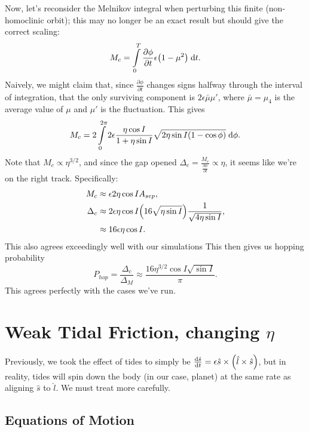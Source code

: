 \documentclass[11pt,
        usenames, %
        dvipsnames %
    ]{article}
\newcommand*{\rd}[2]{\frac{\mathrm{d}#1}{\mathrm{d}#2}}
\newcommand*{\pd}[2]{\frac{\partial#1}{\partial#2}}
\DeclarePairedDelimiter\p{\lparen}{\rparen}
\begin{document}
Now, let's reconsider the Melnikov integral when perturbing this finite
(non-homoclinic orbit); this may no longer be an exact result but should give
the correct scaling:
\begin{equation}
    M_c = \int\limits_0^T \pd{\phi}{t}\epsilon \p*{1 - \mu^2}\;\mathrm{d}t.
\end{equation}
Naively, we might claim that, since $\pd{\phi}{t}$ changes signs halfway through
the interval of integration, that the only surviving component is $2\epsilon
\bar{\mu}\mu'$, where $\bar{\mu} = \mu_4$ is the average value of $\mu$ and
$\mu'$ is the fluctuation. This gives
\begin{equation}
    M_c = 2\int\limits_0^{2\pi}2\epsilon \frac{\eta \cos I}{1 + \eta \sin I}
        \sqrt{2\eta \sin I \p*{1 - \cos \phi}}\;\mathrm{d}\phi.
\end{equation}
Note that $M_c \propto \eta^{3/2}$, and since the gap opened $\Delta_c =
\frac{M_c}{\pd{\phi}{t}} \propto \eta$, it seems like we're on the right track.
Specifically:
\begin{align}
    M_c &\approx \epsilon 2\eta \cos I A_{sep},\\
    \Delta_c &\approx 2\epsilon \eta \cos I \p*{16 \sqrt{\eta \sin I}}
        \frac{1}{\sqrt{4\eta \sin I}},\\
        &\approx 16\epsilon \eta \cos I.
\end{align}
This also agrees exceedingly well with our simulations This then gives us
hopping probability
\begin{equation}
    P_{hop} = \frac{\Delta_c}{\Delta_M} \approx
        \frac{16\eta^{3/2}\cos I \sqrt{\sin I}}{\pi}.
\end{equation}
This agrees perfectly with the cases we've run.

\section{Weak Tidal Friction, changing $\eta$}

Previously, we took the effect of tides to simply be $\rd{\hat{s}}{t} = \epsilon
\hat{s} \times \p*{\hat{l} \times \hat{s}}$, but in reality, tides will spin
down the body (in our case, planet) at the same rate as aligning $\hat{s}$ to
$\hat{l}$. We must treat more carefully.

\subsection{Equations of Motion}
\end{document}
